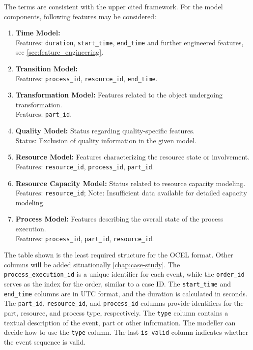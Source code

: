 The terms are consistent with the upper cited framework. For the model components, following features may be considered:

\begin{enumerate}
  \item \textbf{Time Model:}
        \\ Features: \texttt{duration}, \texttt{start\_time}, \texttt{end\_time} and further engineered features, see \autoref{sec:feature_engineering}.

  \item \textbf{Transition Model:}
        \\ Features: \texttt{process\_id}, \texttt{resource\_id}, \texttt{end\_time}.

  \item \textbf{Transformation Model:} Features related to the object undergoing transformation.
        \\ Features: \texttt{part\_id}.

  \item \textbf{Quality Model:} Status regarding quality-specific features.
        \\ Status: Exclusion of quality information in the given model.

  \item \textbf{Resource Model:} Features characterizing the resource state or involvement.
        \\ Features: \texttt{resource\_id}, \texttt{process\_id}, \texttt{part\_id}.

  \item \textbf{Resource Capacity Model:} Status related to resource capacity modeling.
        \\ Features: \texttt{resource\_id}; Note: Insufficient data available for detailed capacity modeling.

  \item \textbf{Process Model:} Features describing the overall state of the process execution.
        \\ Features: \texttt{process\_id}, \texttt{part\_id}, \texttt{resource\_id}.
\end{enumerate}

The table shown is the least required structure for the OCEL format. Other columns will be added situationally \autoref{chap:case-study}. The \texttt{process\_execution\_id} is a unique identifier for each event, while the \texttt{order\_id} serves as the index for the order, similar to a case ID. The \texttt{start\_time} and \texttt{end\_time} columns are in UTC format, and the duration is calculated in seconds. The \texttt{part\_id}, \texttt{resource\_id}, and \texttt{process\_id} columns provide identifiers for the part, resource, and process type, respectively. The \texttt{type} column contains a textual description of the event, part or other information. The modeller can decide how to use the \texttt{type} column. The last \texttt{is\_valid} column indicates whether the event sequence is valid.


